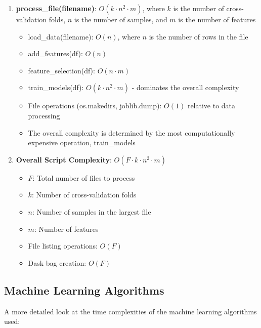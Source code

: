 \documentclass[11pt,a4paper]{article}
\begin{document}
\begin{enumerate}
    \item \textbf{process\_file(filename)}: $O(k \cdot n^2 \cdot m)$, where $k$ is the number of cross-validation folds, $n$ is the number of samples, and $m$ is the number of features
    \begin{itemize}
        \item load\_data(filename): $O(n)$, where $n$ is the number of rows in the file
        \item add\_features(df): $O(n)$
        \item feature\_selection(df): $O(n \cdot m)$
        \item train\_models(df): $O(k \cdot n^2 \cdot m)$ - dominates the overall complexity
        \item File operations (os.makedirs, joblib.dump): $O(1)$ relative to data processing
        \item The overall complexity is determined by the most computationally expensive operation, train\_models
    \end{itemize}

    \item \textbf{Overall Script Complexity}: $O(F \cdot k \cdot n^2 \cdot m)$
    \begin{itemize}
        \item $F$: Total number of files to process
        \item $k$: Number of cross-validation folds
        \item $n$: Number of samples in the largest file
        \item $m$: Number of features
    \end{itemize}
    \begin{itemize}
        \item File listing operations: $O(F)$
        \item Dask bag creation: $O(F)$
    \end{itemize}
\end{enumerate}

\subsection{Machine Learning Algorithms}
A more detailed look at the time complexities of the machine learning algorithms used:
\end{document}
